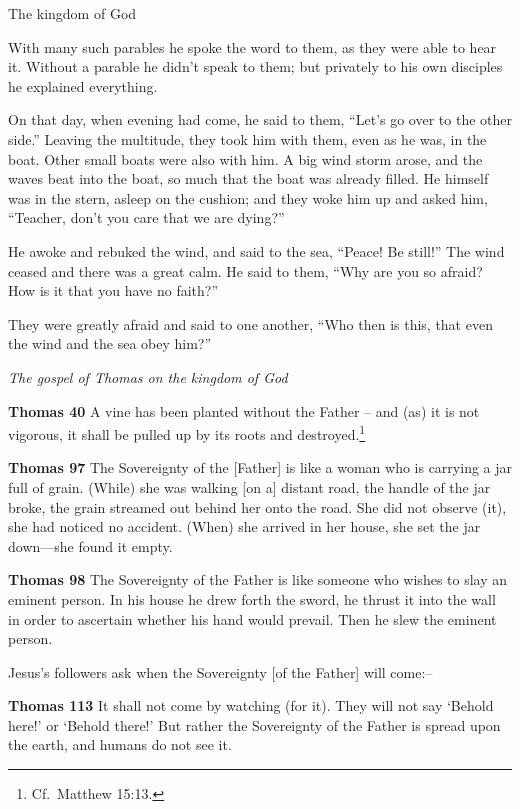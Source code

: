 \documentclass[10pt,twoside]{article} %
\newcommand{\quotesize}{\normalsize{}}
\newcommand{\comm}[1]{\begingroup \color{black!50} #1\endgroup}
\newenvironment{quotetext}{\begingroup\quotesize}{\endgroup}
\newcommand{\bible}[2]{\begin{quotetext}\textbf{#1} #2\end{quotetext}}
\newcommand{\thomas}[2]{\bible{Thomas #1}{#2}}
\newcommand{\subhead}[1]{\emph{#1}\par}
\begin{document}
\begin{section}{The kingdom of God}
{  With many such parables he spoke the word to them, as they were able to hear it.   Without a parable he didn't speak to them; but privately to his own disciples he explained everything.

  On that day, when evening had come, he said to them, ``Let's go over to the other side.''   Leaving the multitude, they took him with them, even as he was, in the boat. Other small boats were also with him.   A big wind storm arose, and the waves beat into the boat, so much that the boat was already filled.   He himself was in the stern, asleep on the cushion; and they woke him up and asked him, ``Teacher, don't you care that we are dying?''

  He awoke and rebuked the wind, and said to the sea, ``Peace! Be still!'' The wind ceased and there was a great calm.   He said to them, ``Why are you so afraid? How is it that you have no faith?''

  They were greatly afraid and said to one another, ``Who then is this, that even the wind and the sea obey him?'' 
}

\subhead{The gospel of Thomas on the kingdom of God}

\thomas{40}{
A vine has been planted without the Father -- and (as) it is not vigorous, it shall be pulled up by its roots and destroyed.\footnote{Cf.~Matthew 15:13.}
}

\thomas{97}{
The Sovereignty of the [Father] is like a woman who is carrying a jar full of grain. (While) she was walking [on a] distant road, the handle of the jar broke, the grain streamed out behind her onto the road. She did not observe (it), she had noticed no accident. (When) she arrived in her house, she set the jar down—she found it empty.
}

\thomas{98}{
The Sovereignty of the Father is like someone who wishes to slay an eminent person. In his house he drew forth the sword, he thrust it into the wall in order to ascertain whether his hand would prevail. Then he slew the eminent person.
}

\comm{Jesus's followers ask when the Sovereignty [of the Father] will come:--}

\thomas{113}{
It shall not come by watching (for it). They will not say `Behold here!' or `Behold there!' But rather the Sovereignty of the Father is spread upon the earth, and humans do not see it.
}

\end{section}
\end{document}
